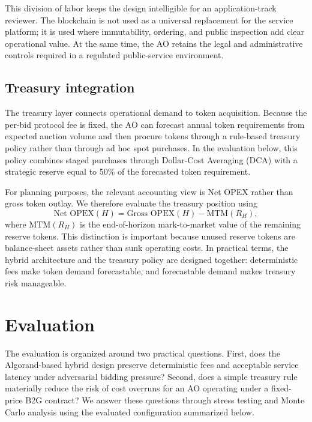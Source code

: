 \documentclass[runningheads]{llncs}
\begin{document}
This division of labor keeps the design intelligible for an application-track
reviewer. The blockchain is not used as a universal replacement for the service
platform; it is used where immutability, ordering, and public inspection add
clear operational value. At the same time, the AO retains the legal and
administrative controls required in a regulated public-service environment.

\subsection{Treasury integration}

The treasury layer connects operational demand to token acquisition. Because the
per-bid protocol fee is fixed, the AO can forecast annual token requirements from
expected auction volume and then procure tokens through a rule-based treasury
policy rather than through ad hoc spot purchases. In the evaluation below, this
policy combines staged purchases through Dollar-Cost Averaging (DCA) with a
strategic reserve equal to 50\% of the forecasted token requirement.

For planning purposes, the relevant accounting view is Net OPEX rather than
gross token outlay. We therefore evaluate the treasury position using
\begin{equation}
\text{Net OPEX}(H) = \text{Gross OPEX}(H) - \text{MTM}(R_H),
\end{equation}
where $\text{MTM}(R_H)$ is the end-of-horizon mark-to-market value of the
remaining reserve tokens. This distinction is important because unused reserve
tokens are balance-sheet assets rather than sunk operating costs. In practical
terms, the hybrid architecture and the treasury policy are designed together:
deterministic fees make token demand forecastable, and forecastable demand
makes treasury risk manageable.

\section{Evaluation}

The evaluation is organized around two practical questions. First, does the
Algorand-based hybrid design preserve deterministic fees and acceptable service
latency under adversarial bidding pressure? Second, does a simple treasury rule
materially reduce the risk of cost overruns for an AO operating under a
fixed-price B2G contract? We answer these questions through stress testing and
Monte Carlo analysis using the evaluated configuration summarized below.
\end{document}
